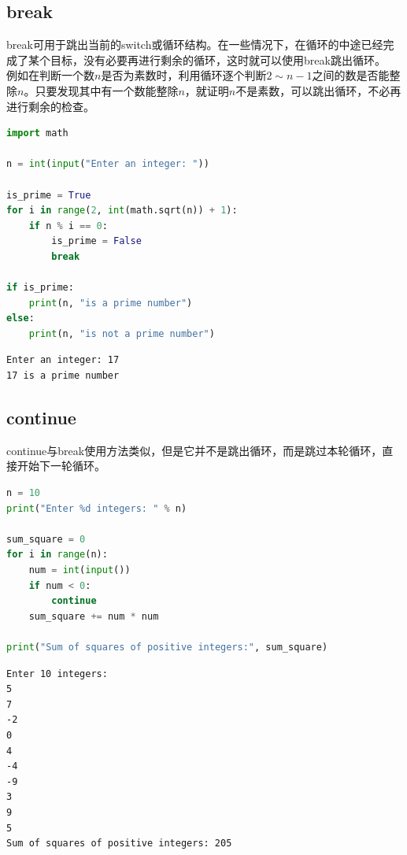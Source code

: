 \subsection{break}

break可用于跳出当前的switch或循环结构。在一些情况下，在循环的中途已经完成了某个目标，没有必要再进行剩余的循环，这时就可以使用break跳出循环。\\

例如在判断一个数$ n $是否为素数时，利用循环逐个判断$ 2 \sim n - 1 $之间的数是否能整除$ n $。只要发现其中有一个数能整除$ n $，就证明$ n $不是素数，可以跳出循环，不必再进行剩余的检查。\\


\begin{lstlisting}[language=Python]
import math

n = int(input("Enter an integer: "))

is_prime = True
for i in range(2, int(math.sqrt(n)) + 1):
	if n % i == 0:
		is_prime = False
		break

if is_prime:
	print(n, "is a prime number")
else:
	print(n, "is not a prime number")
\end{lstlisting}

\begin{tcolorbox}
	\begin{verbatim}
Enter an integer: 17
17 is a prime number
\end{verbatim}
\end{tcolorbox}

\vspace{0.5cm}

\subsection{continue}

continue与break使用方法类似，但是它并不是跳出循环，而是跳过本轮循环，直接开始下一轮循环。\\


\begin{lstlisting}[language=Python]
n = 10
print("Enter %d integers: " % n)

sum_square = 0
for i in range(n):
	num = int(input())
	if num < 0:
		continue
	sum_square += num * num

print("Sum of squares of positive integers:", sum_square)
\end{lstlisting}

\begin{tcolorbox}
	\begin{verbatim}
Enter 10 integers: 
5 
7
-2
0
4
-4
-9
3
9
5
Sum of squares of positive integers: 205
\end{verbatim}
\end{tcolorbox}

\newpage